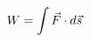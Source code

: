 \documentclass[preview]{standalone}
\begin{document}
\begin{align*}
\special{dvisvgm:raw <g id='unique000'>}W = \int \vec{F} \cdot d\vec{s}\special{dvisvgm:raw </g>}
\end{align*}
\end{document}
